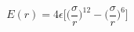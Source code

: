 \documentclass[12pt]{article}
\begin{document}
$$
   E(r) = 4\epsilon\Big[\Big(\frac{\sigma}{r}\Big)^{12} - \Big(\frac{\sigma}{r}\Big)^6\Big]
$$
\end{document}
